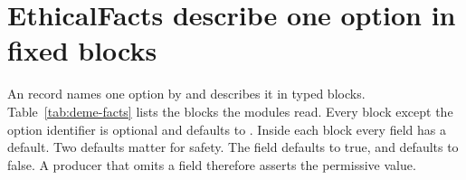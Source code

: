 \section{EthicalFacts describe one option in fixed blocks}\label{sec:deme-facts}

An  record names one option by  and describes it in typed
blocks. Table~\ref{tab:deme-facts} lists the blocks the modules read. Every block except the
option identifier is optional and defaults to . Inside each block every field has a
default. Two defaults matter for safety. The field  defaults to true,
and  defaults to false. A producer that omits a field therefore asserts
the permissive value.

